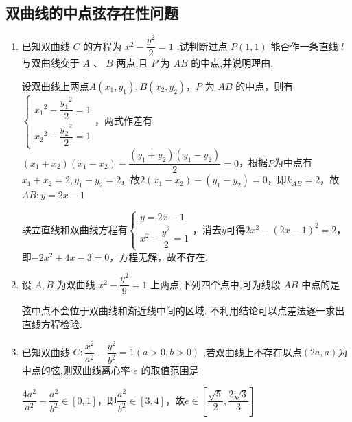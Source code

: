 \subsection*{双曲线的中点弦存在性问题}
\begin{enumerate}
    \item 已知双曲线 ${C}$ 的方程为 ${x}^{2} - \dfrac{{y}^{2}}{2} = 1$ ,试判断过点 $P\left( {1,1}\right)$ 能否作一条直线 $l$ 与双曲线交于 $A\text{ 、 }B$ 两点,且 $P$ 为 ${AB}$ 的中点,并说明理由.
    \begin{jieda}
        设双曲线上两点$A(x_1, y_1), B(x_2, y_2)$，$P$ 为 ${AB}$ 的中点，则有$\left\{\begin{array}{l}
                {x_1}^{2} - \dfrac{{y_1}^{2}}{2} = 1  \\
                {x_2}^{2} - \dfrac{{y_2}^{2}}{2} = 1
        \end{array}\right.$，两式作差有$(x_1+x_2)(x_1-x_2) - \dfrac{(y_1+y_2)(y_1-y_2)}{2} = 0$，根据$P$为中点有$x_1+x_2 = 2, y_1+y_2 = 2$，故$2(x_1-x_2) - (y_1-y_2) = 0$，即$k_{AB} = 2$，故$AB: y = 2x-1$

        联立直线和双曲线方程有$\left\{\begin{array}{l}
                y = 2x-1  \\
                {x}^{2} - \dfrac{{y}^{2}}{2} = 1
        \end{array}\right.$，消去$y$可得$2x^2-(2x-1)^2 = 2$，即$-2x^2+4x-3=0$，方程无解，故不存在.
    \end{jieda}

    \item 设 $A,B$ 为双曲线 ${x}^{2} - \dfrac{{y}^{2}}{9} = 1$ 上两点,下列四个点中,可为线段 ${AB}$ 中点的是
    \begin{jieda}
        弦中点不会位于双曲线和渐近线中间的区域. 不利用结论可以点差法逐一求出直线方程检验.
    \end{jieda}
    
    \item 已知双曲线 $C : \dfrac{{x}^{2}}{{a}^{2}} - \dfrac{{y}^{2}}{{b}^{2}} = 1\left( {a > 0,b > 0}\right)$ ,若双曲线上不存在以点$(2a, a)$为中点的弦,则双曲线离心率 $e$ 的取值范围是
    \begin{jieda}
        $\dfrac{4{a}^{2}}{{a}^{2}} - \dfrac{a^{2}}{{b}^{2}} \in [0, 1]$，即$\dfrac{a^{2}}{{b}^{2}} \in [3, 4]$，故$e \in \left\lbrack  {\dfrac{\sqrt{5}}{2},\dfrac{2\sqrt{3}}{3}}\right\rbrack$
    \end{jieda}
\end{enumerate}
